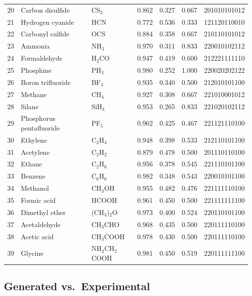 \documentclass[11pt,twocolumn,a4paper]{article}
\theoremstyle{definition}
\theoremstyle{remark}
\begin{document}
\begin{table}[!ht]
\begin{tabular}{@{}rllcccl@{}}
20 & Carbon disulfide & CS$_2$   & 0.862 & 0.327 & 0.667 & 201010101012 \\
21 & Hydrogen cyanide & HCN      & 0.772 & 0.536 & 0.333 & 121120110010 \\
22 & Carbonyl sulfide & OCS      & 0.884 & 0.358 & 0.667 & 210110101012 \\
\midrule
23 & Ammonia          & NH$_3$   & 0.970 & 0.311 & 0.833 & 220010102112 \\
24 & Formaldehyde     & H$_2$CO  & 0.947 & 0.419 & 0.600 & 212221111110 \\
25 & Phosphine        & PH$_3$   & 0.980 & 0.252 & 1.000 & 220020202122 \\
26 & Boron trifluoride& BF$_3$   & 0.935 & 0.340 & 0.500 & 212010101100 \\
27 & Methane          & CH$_4$   & 0.927 & 0.308 & 0.667 & 221010001012 \\
28 & Silane           & SiH$_4$  & 0.953 & 0.265 & 0.833 & 221020102112 \\
29 & Phosphorus pentafluoride & PF$_5$ & 0.962 & 0.425 & 0.467 & 221121110100 \\
\midrule
30 & Ethylene         & C$_2$H$_4$ & 0.948 & 0.398 & 0.533 & 212110101100 \\
31 & Acetylene        & C$_2$H$_2$ & 0.879 & 0.478 & 0.500 & 201110110100 \\
32 & Ethane           & C$_2$H$_6$ & 0.956 & 0.378 & 0.545 & 221110101100 \\
33 & Benzene          & C$_6$H$_6$ & 0.982 & 0.348 & 0.543 & 220010101100 \\
34 & Methanol         & CH$_3$OH  & 0.955 & 0.482 & 0.476 & 221111110100 \\
35 & Formic acid      & HCOOH    & 0.961 & 0.450 & 0.500 & 221111111100 \\
36 & Dimethyl ether   & (CH$_3$)$_2$O & 0.973 & 0.400 & 0.524 & 220110101100 \\
37 & Acetaldehyde     & CH$_3$CHO & 0.968 & 0.435 & 0.500 & 220111110100 \\
38 & Acetic acid      & CH$_3$COOH & 0.978 & 0.430 & 0.500 & 220111110100 \\
39 & Glycine          & NH$_2$CH$_2$COOH & 0.981 & 0.450 & 0.519 & 220111111100 \\
\bottomrule
\end{tabular}
\end{table}

\subsection{Generated vs.\ Experimental}
\label{sec:generated-vs-experimental}
\end{document}
